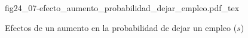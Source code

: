 \begin{figure}[h]
\centering
\def\svgwidth{0.9\textwidth}
{fig24_07-efecto_aumento_probabilidad_dejar_empleo.pdf_tex}
\caption{Efectos de un aumento en la probabilidad de dejar un empleo ($s$)}
\label{fig24_07-efecto_aumento_probabilidad_dejar_empleo}
\end{figure}